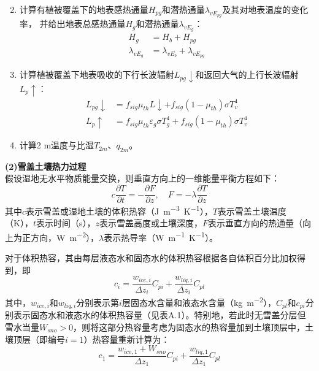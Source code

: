 \begin{enumerate}
\begin{equation}
    \end{equation}
    \item 计算有植被覆盖下的地表感热通量$H_{pg}$和潜热通量$\lambda_{vE_{pg}}$及其对地表温度的变化率，
    并给出地表总感热通量$H_g$和潜热通量$\lambda_{vE_g}$：
    \begin{equation}
      \begin{aligned} 
        H_{g} &=H_{b}+H_{p g} \\ 
        \lambda_{vE_{g}} &=\lambda_{vE_{b}}+\lambda_{vE_{pg}} 
      \end{aligned}
    \end{equation}
    \item 计算植被覆盖下地表吸收的下行长波辐射$L_{pg}\downarrow$和返回大气的上行长波辐射$L_p\uparrow$：
    \begin{equation}
      \begin{aligned}
        L_{pg} \downarrow &= f_{sig} \mu_{th} L \downarrow+f_{sig} \left(1-\mu_{t h}\right) \sigma T_{v}^{4} \\
        L_{p} \uparrow &= f_{sig} \mu_{t h} \varepsilon_{g} \sigma T_{g}^{4}+f_{sig} \left(1-\mu_{t h}\right) \sigma T_{v}^{4}
      \end{aligned}
    \end{equation}
    \item 计算2 m温度与比湿$T_{2m}$、$q_{2m}$。
\end{enumerate}


\textbf {(2)雪盖土壤热力过程}\\

假设湿地无水平物质能量交换，则垂直方向上的一维能量平衡方程如下：
\begin{equation}\label{eq:WetlandThermalCons}
    c \frac{\partial T}{\partial t}=-\frac{\partial F}{\partial z},  \quad F=-\lambda \frac{\partial T}{\partial z}
\end{equation}
其中$c$表示雪盖或湿地土壤的体积热容（\unit{J.m^{-3}.K^{-1}}），$T$表示雪盖土壤温度（K），$t$表示时间（s），$z$表示雪盖高度或土壤深度，$F$表示垂直方向的热通量（向上为正方向，\unit{W.m^{-2}}），$\lambda$表示热导率（\unit{W.m^{-1}.K^{-1}}）。

对于体积热容，其由每层液态水和固态水的体积热容根据各自体积百分比加权得到，即
\begin{equation}
    c_i = \frac{w_{ice,i}}{\Delta z_i}C_{pi} + \frac{w_{liq,i}}{\Delta z_i}C_{pl}
\end{equation}
其中，$w_{ice,i}$和$w_{liq,i}$分别表示第$i$层固态水含量和液态水含量（\unit{kg.m^{-2}}），$C_{pl}$和$c_{pi}$分别表示固态水和液态水的体积热容量（见表A.1）。特别地，若此时无雪盖分层但雪水当量$W_{sno}>0$，则将这部分热容量考虑为固态水的热容量加到土壤顶层中，土壤顶层（即编号$i=1$）热容量重新计算为：
\begin{equation}
    c_1 = \frac{w_{ice,1}+W_{sno}}{\Delta z_1}C_{pi} + \frac{w_{liq,1}}{\Delta z_1}C_{pl}
\end{equation}

